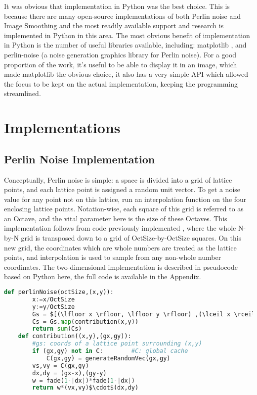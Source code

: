 \documentclass[11pt,a4paper]{article}
\begin{document}
It was obvious that implementation in Python was the best choice. This is because there are many open-source implementations of both Perlin noise and Image Smoothing \cite{gaussmooth} and the most readily available support and research is implemented in Python in this area. The most obvious benefit of implementation in Python is the number of useful libraries available, including: matplotlib \cite{matplotlib}, and perlin-noise \cite{perlinpy} (a noise generation graphics library for Perlin noise). For a good proportion of the work, it’s useful to be able to display it in an image, which made matplotlib the obvious choice, it also has a very simple API which allowed the focus to be kept on the actual implementation, keeping the programming streamlined.

\section{Implementations}

\subsection{Perlin Noise Implementation}

Conceptually, Perlin noise is simple: a space is divided into a grid of lattice points, and each lattice point is assigned a random unit vector. To get a noise value for any point not on this lattice, run an interpolation function on the four enclosing lattice points. Notation-wise, each square of this grid is referred to as an Octave, and the vital parameter here is the size of these Octaves. This implementation follows from code previously implemented \cite{perlinpy},  where the whole N-by-N grid is transposed down to a grid of OctSize-by-OctSize squares. On this new grid, the coordinates which are whole numbers are treated as the lattice points, and interpolation is used to sample from any non-whole number coordinates. The two-dimensional implementation is described in pseudocode based on Python here, the full code is available in the Appendix.

\begin{lstlisting}[language=Python, mathescape=true]
	def perlinNoise(octSize,(x,y)):
		x:=x/OctSize
		y:=y/OctSize
		Gs = $[(\lfloor x \rfloor, \lfloor y \rfloor) ,(\lceil x \rceil, \lfloor y \rfloor), (\lfloor x \rfloor, \lceil y \rceil), (\lceil x \rceil, \lceil y \rceil)]$
		Cs = Gs.map(contribution(x,y))
		return sum(Cs)
	def contribution((x,y),(gx,gy)): 		
		#gs: coords of a lattice point surrounding (x,y)
		if (gx,gy) not in C:		#C: global cache
			C(gx,gy) = generateRandomVec(gx,gy)
		vs,vy = C(gx,gy)
		dx,dy = (gx-x),(gy-y)	
		w = fade(1-|dx|)*fade(1-|dx|)
		return w*(vx,vy)$\cdot$(dx,dy)
\end{lstlisting}
\end{document}

